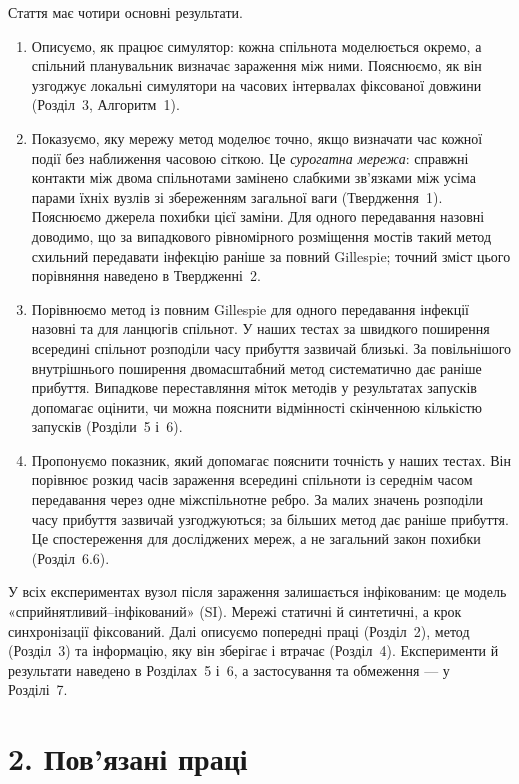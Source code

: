 \documentclass[11pt,a4paper]{article}
\begin{document}
Стаття має чотири основні результати.
\begin{enumerate}
\item Описуємо, як працює симулятор: кожна спільнота моделюється окремо, а спільний планувальник визначає зараження між ними. Пояснюємо, як він узгоджує локальні симулятори на часових інтервалах фіксованої довжини (Розділ~3, Алгоритм~1).
\item Показуємо, яку мережу метод моделює точно, якщо визначати час кожної події без наближення часовою сіткою. Це \emph{сурогатна мережа}: справжні контакти між двома спільнотами замінено слабкими зв'язками між усіма парами їхніх вузлів зі збереженням загальної ваги (Твердження~1). Пояснюємо джерела похибки цієї заміни. Для одного передавання назовні доводимо, що за випадкового рівномірного розміщення мостів такий метод схильний передавати інфекцію раніше за повний Gillespie; точний зміст цього порівняння наведено в Твердженні~2.
\item Порівнюємо метод із повним Gillespie для одного передавання інфекції назовні та для ланцюгів спільнот. У наших тестах за швидкого поширення всередині спільнот розподіли часу прибуття зазвичай близькі. За повільнішого внутрішнього поширення двомасштабний метод систематично дає раніше прибуття. Випадкове переставляння міток методів у результатах запусків допомагає оцінити, чи можна пояснити відмінності скінченною кількістю запусків (Розділи~5 і~6).
\item Пропонуємо показник, який допомагає пояснити точність у наших тестах. Він порівнює розкид часів зараження всередині спільноти із середнім часом передавання через одне міжспільнотне ребро. За малих значень розподіли часу прибуття зазвичай узгоджуються; за більших метод дає раніше прибуття. Це спостереження для досліджених мереж, а не загальний закон похибки (Розділ~6.6).
\end{enumerate}
У всіх експериментах вузол після зараження залишається інфікованим: це модель «сприйнятливий--інфікований» (SI). Мережі статичні й синтетичні, а крок синхронізації фіксований. Далі описуємо попередні праці (Розділ~2), метод (Розділ~3) та інформацію, яку він зберігає і втрачає (Розділ~4). Експерименти й результати наведено в Розділах~5 і~6, а застосування та обмеження --- у Розділі~7.
\clearpage
\section*{2. Пов'язані праці}
\end{document}
